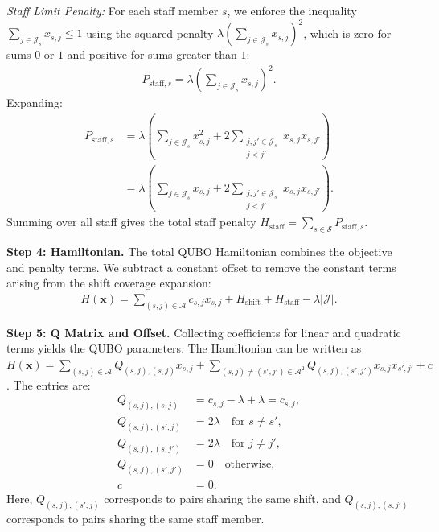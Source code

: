\documentclass[12pt]{article}
\begin{document}
\textit{Staff Limit Penalty:}
For each staff member $s$, we enforce the inequality $\sum_{j \in \mathcal{J}_s} x_{s,j} \le 1$ using the squared penalty $\lambda \left( \sum_{j \in \mathcal{J}_s} x_{s,j} \right)^2$, which is zero for sums $0$ or $1$ and positive for sums greater than $1$:
\begin{align}
    P_{\text{staff},s} = \lambda \left( \sum_{j \in \mathcal{J}_s} x_{s,j} \right)^2.
\end{align}
Expanding:
\begin{align}
    P_{\text{staff},s} &= \lambda \left( \sum_{j \in \mathcal{J}_s} x_{s,j}^2 + 2 \sum_{\substack{j,j' \in \mathcal{J}_s \\ j < j'}} x_{s,j} x_{s,j'} \right) \\
    &= \lambda \left( \sum_{j \in \mathcal{J}_s} x_{s,j} + 2 \sum_{\substack{j,j' \in \mathcal{J}_s \\ j < j'}} x_{s,j} x_{s,j'} \right).
\end{align}
Summing over all staff gives the total staff penalty $H_{\text{staff}} = \sum_{s \in \mathcal{S}} P_{\text{staff},s}$.

\textbf{Step 4: Hamiltonian.}
The total QUBO Hamiltonian combines the objective and penalty terms. We subtract a constant offset to remove the constant terms arising from the shift coverage expansion:
\begin{align}
    H(\mathbf{x}) = \sum_{(s,j) \in \mathcal{A}} c_{s,j} x_{s,j} + H_{\text{shift}} + H_{\text{staff}} - \lambda |\mathcal{J}|.
\end{align}

\textbf{Step 5: Q Matrix and Offset.}
Collecting coefficients for linear and quadratic terms yields the QUBO parameters. The Hamiltonian can be written as $H(\mathbf{x}) = \sum_{(s,j) \in \mathcal{A}} Q_{(s,j),(s,j)} x_{s,j} + \sum_{(s,j) \neq (s',j') \in \mathcal{A}^2} Q_{(s,j),(s',j')} x_{s,j} x_{s',j'} + c$. The entries are:
\begin{align}
    Q_{(s,j),(s,j)} &= c_{s,j} - \lambda + \lambda = c_{s,j}, \\
    Q_{(s,j),(s',j)} &= 2\lambda \quad \text{for } s \neq s', \\
    Q_{(s,j),(s,j')} &= 2\lambda \quad \text{for } j \neq j', \\
    Q_{(s,j),(s',j')} &= 0 \quad \text{otherwise}, \\
    c &= 0.
\end{align}
Here, $Q_{(s,j),(s',j)}$ corresponds to pairs sharing the same shift, and $Q_{(s,j),(s,j')}$ corresponds to pairs sharing the same staff member.
\end{document}
